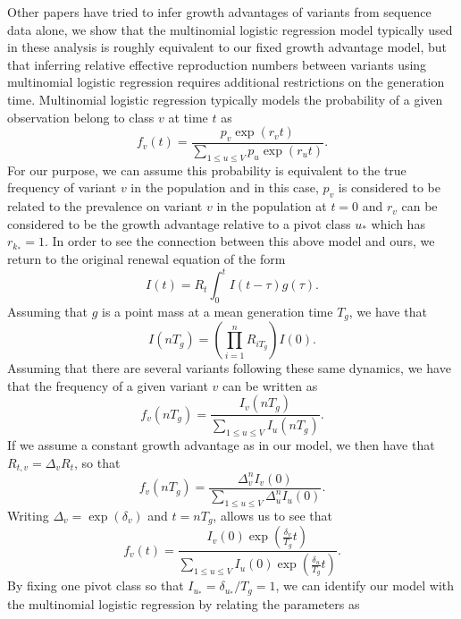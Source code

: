 \documentclass[11pt,oneside,letterpaper]{article}
\begin{document}
Other papers have tried to infer growth advantages of variants from sequence data alone, we show that the multinomial logistic regression model typically used in these analysis is roughly equivalent to our fixed growth advantage model, but that inferring relative effective reproduction numbers between variants using multinomial logistic regression requires additional restrictions on the generation time.
Multinomial logistic regression typically models the probability of a given observation belong to class $v$ at time $t$ as
\begin{equation}
  f_{v}(t) = \frac{p_{v}\exp(r_{v} t)}{\sum_{1\leq u\leq V} p_{u}\exp(r_{u} t)}.
\end{equation}
For our purpose, we can assume this probability is equivalent to the true frequency of variant $v$ in the population and in this case, $p_{v}$ is considered to be related to the prevalence on variant $v$ in the population at $t=0$ and $r_{v}$ can be considered to be the growth advantage relative to a pivot class $u_{*}$ which has $r_{k_{*}} = 1$.
In order to see the connection between this above model and ours, we return to the original renewal equation of the form
\begin{equation}
  I(t) = R_{t}\int_{0}^{t} I(t-\tau) g(\tau).
\end{equation}
Assuming that $g$  is a point mass at a mean generation time $T_{g}$, we have that
\begin{equation}
  I(nT_{g}) = \left(\prod_{i=1}^{n} R_{iT_{g}}\right) I(0).
\end{equation}
Assuming that there are several variants following these same dynamics, we have that the frequency of a given variant $v$ can be written as
\begin{equation}
  f_{v}(nT_{g}) = \frac{I_{v}(nT_{g})}{\sum_{1\leq u \leq V} I_{u}(nT_{g})}.
\end{equation}
If we assume a constant growth advantage as in our model, we then have that $R_{t,v} = \Delta_{v} R_{t}$, so that
\begin{equation}
  f_{v}(nT_{g}) =  \frac{\Delta_{v}^{n} I_{v}(0)}{\sum_{1\leq u \leq V} \Delta_{u}^{n} I_{u}(0)}.
\end{equation}
Writing $\Delta_{v} = \exp(\delta_{v})$ and $t = n T_{g}$, allows us to see that
\begin{equation}
  f_{v}(t) = \frac{I_{v}(0) \exp(\frac{\delta_{v}}{T_{g}} t)}{\sum_{1\leq u \leq V}I_{u}(0) \exp(\frac{\delta_{u}}{T_{g}} t)}.
\end{equation}
By fixing one pivot class so that $I_{u_{*}} = \delta_{u_{*}} / T_{g} = 1$, we can identify our model with the multinomial logistic regression by relating the parameters as
\end{document}
